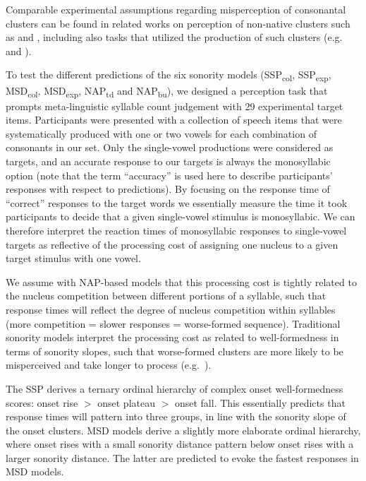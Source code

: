 Comparable experimental assumptions regarding misperception of consonantal clusters can be found in related works on perception of non-native clusters such as \citet{dupoux1999epentheticsk} and \citet{davidson2012sources}, including also tasks that utilized the production of such clusters (e.g. \citealt{davidson2010phoneticsk} and \citealt{wilson2014effects}).

To test the different predictions of the six sonority models
(SSP\textsubscript{col}, SSP\textsubscript{exp}, MSD\textsubscript{col}, MSD\textsubscript{exp}, NAP\textsubscript{td} and NAP\textsubscript{bu}),
we designed a perception task that prompts meta-linguistic syllable count judgement with 29 experimental target items.
Participants were presented with a collection of speech items that were systematically produced with one or two vowels for each combination of consonants in our set.
Only the single-vowel productions were considered as targets, and an accurate response to our targets is always the monosyllabic option (note that the term \enquote{accuracy} is used here to describe participants' responses with respect to predictions).
By focusing on the response time of \enquote{correct} responses to the target words we essentially measure the time it took participants to decide that a given single-vowel stimulus is monosyllabic.
We can therefore interpret the reaction times of monosyllabic responses to single-vowel targets as reflective of the processing cost of assigning one nucleus to a given target stimulus with one vowel.

We assume with NAP-based models that this processing cost is tightly related to the nucleus competition between different portions of a syllable, such that response times will reflect the degree of nucleus competition within syllables (more competition = slower responses = worse-formed sequence). Traditional sonority models interpret the processing cost as related to well-formedness in terms of sonority slopes, such that worse-formed clusters are more likely to be misperceived and take longer to process (e.g.~\citealt{berent2007we, berent2012language, berent2008language, berent2009listeners, lennertz2010people, maionchi2015sonoritysk, sung2016perceptionsk, young2017markednesssk}).

The SSP derives a ternary ordinal hierarchy of complex onset well-formedness scores: onset rise \(>\) onset plateau \(>\) onset fall. This essentially predicts that response times will pattern into three groups, in line with the sonority slope of the onset clusters. MSD models derive a slightly more elaborate ordinal hierarchy, where onset rises with a small sonority distance pattern below onset rises with a larger sonority distance. The latter are predicted to evoke the fastest responses in MSD models.

